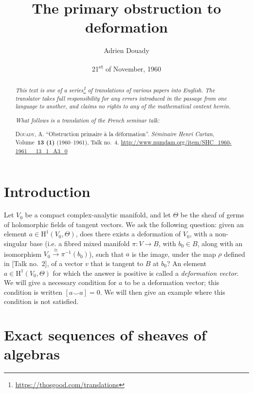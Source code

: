\documentclass{article}
\title{The primary obstruction to deformation}
\author{Adrien Douady}
\date{21\textsuperscript{st} of November, 1960}
\newcommand{\doctype}{French seminar talk}
\newcommand{\origcit}{%
  \textsc{Douady, A.}
  ``Obstruction primaire \`{a} la d\'{e}formation''.
  \emph{S\'{e}minaire Henri Cartan}, Volume~\textbf{13 (1)} (1960--1961), Talk no.~4.
  {\url{http://www.numdam.org/item/SHC_1960-1961__13_1_A3_0}}%
}
\newcommand{\HH}{\mathrm{H}}
\newcommand{\oldpage}[1]{\marginpar{\footnotesize$\Big\vert$ \textit{p.~#1}}}
\begin{document}
\maketitle
\thispagestyle{fancy}

\renewcommand{\abstractname}{Translator's note.}

\begin{abstract}
  \renewcommand*{\thefootnote}{\fnsymbol{footnote}}
  \emph{This text is one of a series\footnote{\url{https://thosgood.com/translations}} of translations of various papers into English.}
  \emph{The translator takes full responsibility for any errors introduced in the passage from one language to another, and claims no rights to any of the mathematical content herein.}

  \medskip
  
  \emph{What follows is a translation of the \doctype:}

  \medskip\noindent
  \origcit
\end{abstract}

\setcounter{footnote}{0}

\tableofcontents
\bigskip



\section*{Introduction}
\label{introduction}

\oldpage{4-01}
Let $V_0$ be a compact complex-analytic manifold, and let $\Theta$ be the sheaf of germs of holomorphic fields of tangent vectors.
We ask the following question: given an element $a\in\HH^1(V_0,\Theta)$, does there exists a deformation of $V_0$, with a non-singular base (i.e. a fibred mixed manifold $\pi\colon V\to B$, with $b_0\in B$, along with an isomorphism $V_0\xrightarrow{\cong}\pi^{-1}(b_0)$), such that $a$ is the image, under the map $\rho$ defined in [Talk no.~2], of a vector $v$ that is tangent to $B$ at $b_0$?
An element $a\in\HH^1(V_0,\Theta)$ for which the answer is positive is called a \emph{deformation vector}.
We will give a necessary condition for $a$ to be a deformation vector;
this condition is written $[a\smile a]=0$.
We will then give an example where this condition is not satisfied.


\section{Exact sequences of sheaves of algebras}
\label{I}
\end{document}
